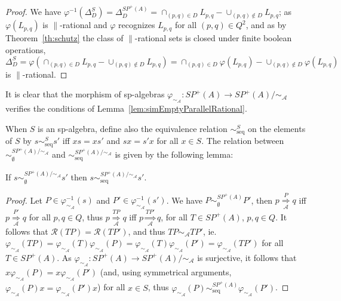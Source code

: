 \documentclass{CSML}
\begin{document}
\begin{proof}
  We have $\varphi^{-1}(\Delta_D^S)=\Delta_D^{SP^+(A)}=\cap_{(p,q)\in D}L_{p,q}-\cup_{(p,q)\not\in D}L_{p,q}$; as $\varphi(L_{p,q})$ is $\parallel$-rational and $\varphi$ recognizes $L_{p,q}$ for all $(p,q)\in Q^2$, and as by Theorem~\ref{th:schutz} the class of $\parallel$-rational sets is closed under finite boolean operations, $\Delta_D^S=\varphi(\cap_{(p,q)\in D}L_{p,q}-\cup_{(p,q)\not\in D}L_{p,q})=\cap_{(p,q)\in D}\varphi(L_{p,q})-\cup_{(p,q)\not\in D}\varphi(L_{p,q})$ is $\parallel$-rational.
\end{proof}

It is clear that the morphism of sp-algebras $\varphi_{\sim_{\mathcal{A}}}:SP^+(A)\to SP^+(A)/\mathord\sim_\mathcal{A}$ verifies the conditions of Lemma~\ref{lem:simEmptyParallelRational}.

\medskip

When $S$ is an sp-algebra, define also the equivalence relation $\sim_\text{seq}^S$ on the elements of $S$ by $s\sim_\text{seq}^Ss'$ iff $xs=xs'$ and $sx=s'x$ for all $x\in S$.
The relation between $\sim_\emptyset^{SP^+(A)/\mathord\sim_\mathcal{A}}$ and $\sim_\text{seq}^{SP^+(A)/\mathord\sim_\mathcal{A}}$ is given by the following lemma:
\begin{lem}
  \label{lem:simEmptyImpliqueSimSeq}
  If $s\sim_\emptyset^{SP^+(A)/\mathord\sim_\mathcal{A}}s'$ then $s\sim_\text{seq}^{SP^+(A)/\mathord\sim_\mathcal{A}}s'$.
\end{lem}

\begin{proof}
  Let $P\in\varphi_{\sim_{\mathcal{A}}}^{-1}(s)$ and $P'\in\varphi_{\sim_{\mathcal{A}}}^{-1}(s')$.
  We have $P\sim_\emptyset^{SP^+(A)} P'$, then $p \mathop{\Longrightarrow}\limits_{\mathcal{A}}^{P} q$ iff $p \mathop{\Longrightarrow}\limits_{\mathcal{A}}^{P'} q$ for all $p,q\in Q$, thus $p \mathop{\Longrightarrow}\limits_{\mathcal{A}}^{TP} q$ iff $p \mathop{\Longrightarrow}\limits_{\mathcal{A}}^{TP'} q$, for all $T\in SP^+(A)$, $p,q\in Q$.
  It follows that $\mathcal{R}(TP)=\mathcal{R}(TP')$, and thus $TP\sim_\mathcal{A}TP'$, ie. $\varphi_{\sim_\mathcal{A}}(TP)=\varphi_{\sim_\mathcal{A}}(T)\varphi_{\sim_\mathcal{A}}(P)=\varphi_{\sim_\mathcal{A}}(T)\varphi_{\sim_\mathcal{A}}(P')=\varphi_{\sim_\mathcal{A}}(TP')$ for all $T\in SP^+(A)$.
  As $\varphi_{\sim_\mathcal{A}}:SP^+(A)\to SP^+(A)/\mathord{\sim_{\mathcal{A}}}$ is surjective, it follows that $x\varphi_{\sim_\mathcal{A}}(P)=x\varphi_{\sim_\mathcal{A}}(P')$ (and, using symmetrical arguments, $\varphi_{\sim_\mathcal{A}}(P)x=\varphi_{\sim_\mathcal{A}}(P')x$) for all $x\in S$, thus $\varphi_{\sim_\mathcal{A}}(P)\sim_\text{seq}^{SP^+(A)}\varphi_{\sim_\mathcal{A}}(P')$.
\end{proof}
\end{document}
